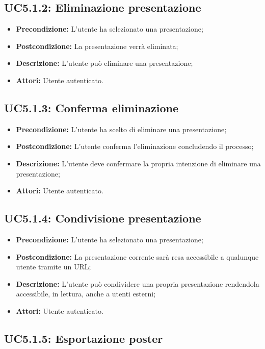 \subsection{ UC5.1.2: Eliminazione presentazione}

\begin{itemize}
	\item \textbf{Precondizione:} L'utente ha selezionato una presentazione;
	\item \textbf{Postcondizione:} La presentazione verrà eliminata;
	\item \textbf{Descrizione:} L'utente può eliminare una presentazione;
	\item \textbf{Attori:} Utente autenticato.
\end{itemize}
\subsection{ UC5.1.3: Conferma eliminazione }

\begin{itemize}
	\item \textbf{Precondizione:} L'utente ha scelto di eliminare una presentazione;
	\item \textbf{Postcondizione:} L'utente conferma l'eliminazione concludendo il processo;
	\item \textbf{Descrizione:} L'utente deve confermare la propria intenzione di eliminare una presentazione;
	\item \textbf{Attori:} Utente autenticato.
\end{itemize}
\subsection{ UC5.1.4: Condivisione presentazione }

\begin{itemize}
	\item \textbf{Precondizione:} L'utente ha selezionato una presentazione;
	\item \textbf{Postcondizione:} La presentazione corrente sarà resa accessibile a qualunque utente tramite un URL;
	\item \textbf{Descrizione:} L'utente può condividere una propria presentazione rendendola accessibile, in lettura, anche a utenti esterni;
	\item \textbf{Attori:} Utente autenticato.
\end{itemize}
\subsection{ UC5.1.5: Esportazione poster}

